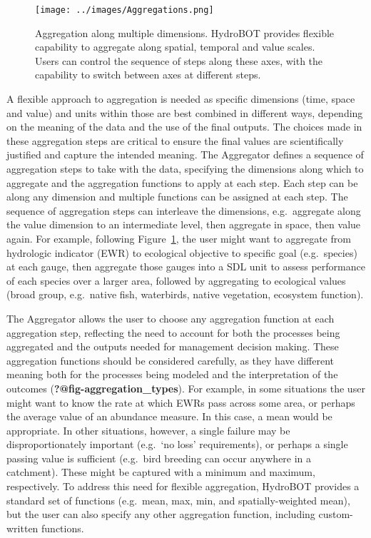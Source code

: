 \documentclass[
  number]{elsarticle}
\begin{document}
\begin{figure}

{\centering \texttt{[image: ../images/Aggregations.png]}

}

\caption{\label{fig-aggregation-dims}Aggregation along multiple
dimensions. HydroBOT provides flexible capability to aggregate along
spatial, temporal and value scales. Users can control the sequence of
steps along these axes, with the capability to switch between axes at
different steps.}

\end{figure}

A flexible approach to aggregation is needed as specific dimensions
(time, space and value) and units within those are best combined in
different ways, depending on the meaning of the data and the use of the
final outputs. The choices made in these aggregation steps are critical
to ensure the final values are scientifically justified and capture the
intended meaning. The Aggregator defines a sequence of aggregation steps
to take with the data, specifying the dimensions along which to
aggregate and the aggregation functions to apply at each step. Each step
can be along any dimension and multiple functions can be assigned at
each step. The sequence of aggregation steps can interleave the
dimensions, e.g.~aggregate along the value dimension to an intermediate
level, then aggregate in space, then value again. For example, following
Figure~\ref{fig-aggregation-dims}, the user might want to aggregate from
hydrologic indicator (EWR) to ecological objective to specific goal
(e.g.~species) at each gauge, then aggregate those gauges into a SDL
unit to assess performance of each species over a larger area, followed
by aggregating to ecological values (broad group, e.g.~native fish,
waterbirds, native vegetation, ecosystem function).

The Aggregator allows the user to choose any aggregation function at
each aggregation step, reflecting the need to account for both the
processes being aggregated and the outputs needed for management
decision making. These aggregation functions should be considered
carefully, as they have different meaning both for the processes being
modeled and the interpretation of the outcomes
(\textbf{?@fig-aggregation\_types}). For example, in some situations the
user might want to know the rate at which EWRs pass across some area, or
perhaps the average value of an abundance measure. In this case, a mean
would be appropriate. In other situations, however, a single failure may
be disproportionately important (e.g.~`no loss' requirements), or
perhaps a single passing value is sufficient (e.g.~bird breeding can
occur anywhere in a catchment). These might be captured with a minimum
and maximum, respectively. To address this need for flexible
aggregation, HydroBOT provides a standard set of functions (e.g.~mean,
max, min, and spatially-weighted mean), but the user can also specify
any other aggregation function, including custom-written functions.
\end{document}
